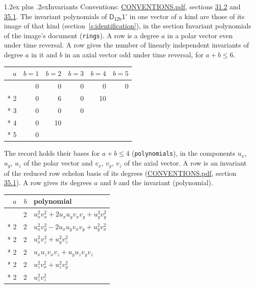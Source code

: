 \documentclass[10pt,a4paper]{article}
\makeatletter
\renewcommand\section{\@startsection{section}{1}{\z@}{-3ex plus -1ex minus -.2ex}%
  {1.2ex plus .2ex}{\normalfont\large\sffamily\bfseries\color{parttitle}}}
\numberwithin{equation}{section}
\newcommand{\grp}[1]{\mathsf{#1}}
\makeatother
\begin{document}
\section{Invariants}\label{s:invariants}
Conventions: \href{../../CONVENTIONS.pdf}{CONVENTIONS.pdf}, sections \href{../../CONVENTIONS.pdf\#conv.31.2}{31.2} and \href{../../CONVENTIONS.pdf\#conv.35.1}{35.1}.
The invariant polynomials of $\grp{D_{12h}1'}$ in one vector of a kind are those of its image of that kind (section~\ref{s:identification}), in the section Invariant polynomials of the image's document (\texttt{rings}).
\leavevmode\label{n:index.degree.polar}\label{n:index.degree.axial}A row is a degree $a$ in a polar vector even under time reversal. A row gives the number of linearly independent invariants of degree $a$ in it and $b$ in an axial vector odd under time reversal, for $a + b \le 6$.
{\small\begin{longtable}{@{}rrrrrr@{}}\toprule
$a$ & $b = 1$ & $b = 2$ & $b = 3$ & $b = 4$ & $b = 5$\\\midrule\endhead
\bottomrule\endfoot\endlastfoot
1 & 0 & 0 & 0 & 0 & 0\\*
2 & 0 & 6 & 0 & 10 & \\*
3 & 0 & 0 & 0 &  & \\*
4 & 0 & 10 &  &  & \\*
5 & 0 &  &  &  & \\
\bottomrule\end{longtable}}
\leavevmode\label{n:local.component.polar}\label{n:local.component.axial}The record holds their bases for $a + b \le 4$ (\texttt{polynomials}), in the components $u_{x}$, $u_{y}$, $u_{z}$ of the polar vector and $v_{x}$, $v_{y}$, $v_{z}$ of the axial vector. \label{n:head.polynomial}A row is an invariant of the reduced row echelon basis of its degrees (\href{../../CONVENTIONS.pdf}{CONVENTIONS.pdf}, section \href{../../CONVENTIONS.pdf\#conv.35.1}{35.1}). A row gives its degrees $a$ and $b$ and the invariant (polynomial).
{\small\renewcommand{\arraystretch}{1.2}\begin{longtable}{@{}rrl@{}}\toprule
$a$ & $b$ & polynomial\\\midrule\endhead
\bottomrule\endfoot\endlastfoot
2 & 2 & $u_{x}^{2}v_{x}^{2} + 2u_{x}u_{y}v_{x}v_{y} + u_{y}^{2}v_{y}^{2}$\\*
2 & 2 & $u_{x}^{2}v_{y}^{2} - 2u_{x}u_{y}v_{x}v_{y} + u_{y}^{2}v_{x}^{2}$\\*
2 & 2 & $u_{x}^{2}v_{z}^{2} + u_{y}^{2}v_{z}^{2}$\\*
2 & 2 & $u_{x}u_{z}v_{x}v_{z} + u_{y}u_{z}v_{y}v_{z}$\\*
2 & 2 & $u_{z}^{2}v_{x}^{2} + u_{z}^{2}v_{y}^{2}$\\*
2 & 2 & $u_{z}^{2}v_{z}^{2}$\\
\bottomrule\end{longtable}}
\end{document}
